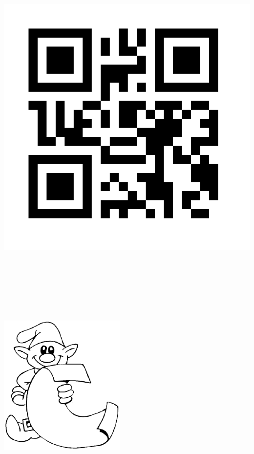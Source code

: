 \documentclass{article}
\begin{document}
\pagestyle{empty}
\begin{center}
\includegraphics[height=20cm]{Elfes}

\vspace{5mm}

\includegraphics[height=7cm]{elfe}
\end{center}
\end{document}
